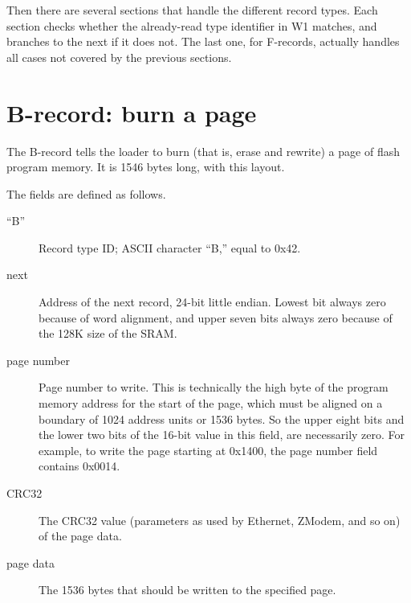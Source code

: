 Then there are several sections that handle the different record types. 
Each section checks whether the already-read type identifier in W1 matches,
and branches to the next if it does not.  The last one, for F-records,
actually handles all cases not covered by the previous sections.

\section{B-record: burn a page}

The B-record tells the loader to burn (that is, erase and rewrite) a page of
flash program memory.  It is 1546 bytes long, with this layout.


The fields are defined as follows.

\begin{description}
  \item[``B''] Record type ID; ASCII character ``B,'' equal to 0x42.
  \item[next] Address of the next record, 24-bit little endian.  Lowest bit
    always zero because of word alignment, and upper seven bits always zero
    because of the 128K size of the SRAM.
  \item[page number] Page number to write.  This is technically the high
    byte of the program memory address for the start of the page, which must
    be aligned on a boundary of 1024 address units or 1536 bytes.  So the
    upper eight bits and the lower two bits of the 16-bit value in this
    field, are necessarily zero.  For example, to write the page starting at
    0x1400, the page number field contains 0x0014.
  \item[CRC32] The CRC32 value (parameters as used by Ethernet, ZModem, and
    so on) of the page data.
  \item[page data] The 1536 bytes that should be written to the specified
    page.
\end{description}

